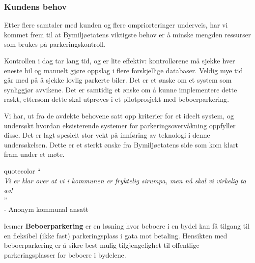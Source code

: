 \documentclass[xetex]{beamer}
\begin{document}
\begin{frame}\label{fr:kundebehov}
	\frametitle{Kundens behov}
	Etter flere samtaler med kunden og flere ompriorteringer underveis, har vi kommet frem til at Bymiljøetatens viktigste behov er å \alert{minske mengden ressurser som brukes på parkeringskontroll}. 
	
	Kontrollen i dag tar \alert{lang tid}, og er \alert{lite effektiv}: kontrollørene må sjekke hver eneste bil og manuelt gjøre oppslag i flere \alert{forskjellige databaser}. Veldig mye tid går med på å sjekke \alert{lovlig} parkerte biler. Det er et ønske om et system som \alert{synliggjør avvikene}. Det er samtidig et ønske om å kunne implementere dette \alert{raskt}, ettersom dette skal utprøves i et pilotprosjekt med \alert{beboerparkering}. 
	
		Vi har, ut fra de avdekte behovene satt opp kriterier for et \alert{ideelt system}, og undersøkt hvordan eksisterende systemer for parkeringsovervåkning oppfyller disse. 	Det er lagt spesielt stor vekt på innføring av teknologi i denne undersøkelsen. Dette er et sterkt ønske fra Bymiljøetatens side som kom klart fram under et møte.
	
	\vspace{1.5em} 

	\begin{beamercolorbox}[wd=0.33\paperwidth,ht=14ex,dp=5pt,leftskip=.3cm,rightskip=.3cm]{quotecolor}
	\huge`` \\[-0.5em]
    \tiny
    \hspace{1.5em}\vspace{0.0em}\emph{Vi er klar over at vi i kommunen er fryktelig sirumpa, men nå skal vi virkelig ta av!} \\ [-1.8em]
    
    \hspace{0.27\paperwidth}\huge'' \\ [-0.3em]
    
    \hfill\tiny- Anonym kommunal ansatt \\ [1em] %
\end{beamercolorbox}

		\hfill\begin{beamercolorbox}[wd=1.0\textwidth, ht=10ex, dp=10pt, leftskip=.3cm, rightskip=.3cm]{lesmer}
	\textbf{Beboerparkering} er en løsning hvor beboere i en bydel kan få tilgang til en fleksibel (ikke fast) parkeringsplass i gata mot betaling. Hensikten med beboerparkering er å sikre best mulig tilgjengelighet til offentlige parkeringsplasser for beboere i bydelene.
\end{beamercolorbox}	
\end{frame}
\end{document}
